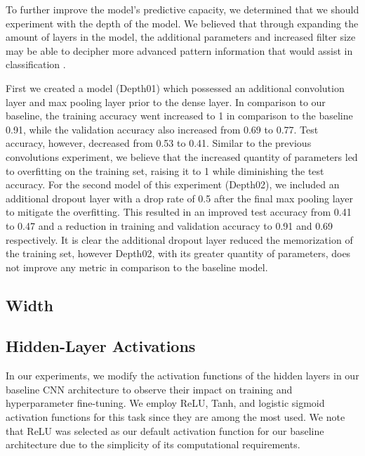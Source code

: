 \documentclass{article}
\begin{document}
To further improve the model's predictive capacity, we determined that we should experiment with the depth of the model. We believed that through expanding the amount of layers in the model, the additional parameters and increased filter size may be able to decipher more advanced pattern information that would assist in classification \cite{Goodfellow-et-al-2016}.

First we created a model (Depth01) which possessed an additional convolution layer and max pooling layer prior to the dense layer. In comparison to our baseline, the training accuracy went increased to 1 in comparison to the baseline 0.91, while the validation accuracy also increased from 0.69 to 0.77. Test accuracy, however, decreased from 0.53 to 0.41. Similar to the previous convolutions experiment, we believe that the increased quantity of parameters led to overfitting on the training set, raising it to 1 while diminishing the test accuracy. For the second model of this experiment (Depth02), we included an additional dropout layer with a drop rate of 0.5 after the final max pooling layer to mitigate the overfitting. This resulted in an improved test accuracy from 0.41 to 0.47 and a reduction in training and validation accuracy to 0.91 and 0.69 respectively. It is clear the additional dropout layer reduced the memorization of the training set, however Depth02, with its greater quantity of parameters, does not improve any metric in comparison to the baseline model.

\subsection{Width}



\subsection{Hidden-Layer Activations}
In our experiments, we modify the activation functions of the hidden layers in our baseline CNN architecture to observe their impact on training and hyperparameter fine-tuning. We employ ReLU, Tanh, and logistic sigmoid activation functions for this task since they are among the most used. We note that ReLU was selected as our default activation function for our baseline architecture due to the simplicity of its computational requirements.
\end{document}
